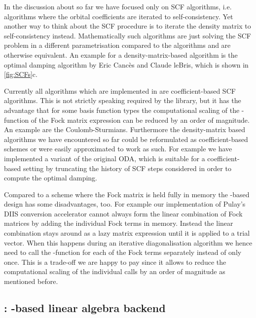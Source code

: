 In the discussion about \gscf so far we have focused only on
 SCF algorithms,
i.e. algorithms where the orbital coefficients are iterated to self-consistency.
Yet another way to think about the SCF procedure is to iterate the
density matrix to self-consistency instead.
Mathematically such  algorithms
are just solving the SCF problem in a different parametrisation
compared to the  algorithms
and are otherwise equivalent.
An example for a density-matrix-based algorithm is the optimal damping algorithm
by Eric Cancès and Claude leBris,
which is shown in \fig \ref{fig:SCFs}c.

Currently all algorithms which are implemented in \gscf are coefficient-based SCF algorithms.
This is not strictly speaking required by the library,
but it has the advantage that for some basis function types
the computational scaling of the \contraction-function
of the Fock matrix expression can be reduced by an order of magnitude.
An example are the Coulomb-Sturmians.
Furthermore the density-matrix based algorithms
we have encountered so far could be reformulated as coefficient-based schemes
or were easily approximated to work as such.
For example we have implemented a variant of the original ODA,
which is suitable for a coefficient-based setting by truncating
the history of SCF steps considered in order to compute the optimal damping.

Compared to a scheme where the Fock matrix is held fully in memory
the \contraction-based design has some disadvantages, too.
For example our implementation of Pulay's DIIS conversion accelerator
cannot always form the linear combination of Fock matrices by adding the
individual Fock terms in memory.
Instead the linear combination stays around as a lazy matrix expression
until it is applied to a trial vector.
When this happens during an iterative diagonalisation algorithm
we hence need to call the \contraction-function for each of the
Fock terms separately instead of only once.
This is a trade-off we are happy to pay since it allows to
reduce the computational scaling of the individual \contraction
calls by an order of magnitude as mentioned before.

%
%
\subsection{\lazyten: \contraction-based linear algebra backend}
%
%

